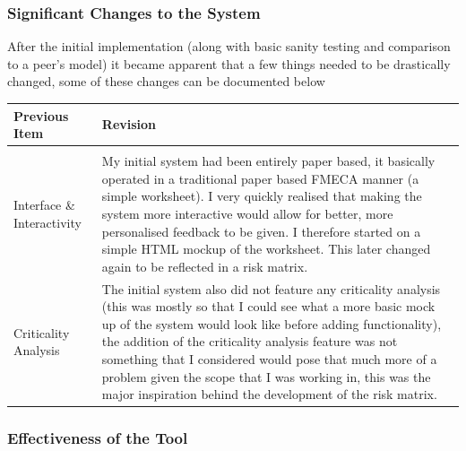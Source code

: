 \documentclass[12pt]{article} %
\begin{document}
\subsubsection{Significant Changes to the System}

After the initial implementation (along with basic sanity testing and comparison to a peer's model) it became apparent that a few things needed to be drastically changed, some of these changes can be documented below
\begin{center}
\begin{tabular}{p{3cm} p{10cm}}
Previous Item & Revision \\
\hline \\
Interface \& Interactivity & My initial system had been entirely paper based, it basically operated in a traditional paper based FMECA manner (a simple worksheet). I very quickly realised that making the system more interactive would allow for better, more personalised feedback to be given. I therefore started on a simple HTML mockup of the worksheet. This later changed again to be reflected in a risk matrix. \\
Criticality Analysis & The initial system also did not feature any criticality analysis (this was mostly so that I could see what a more basic mock up of the system would look like before adding functionality), the addition of the criticality analysis feature was not something that I considered would pose that much more of a problem given the scope that I was working in, this was the major inspiration behind the development of the risk matrix. \\
\end{tabular}
\end{center}

\subsubsection{Effectiveness of the Tool}
\end{document}
